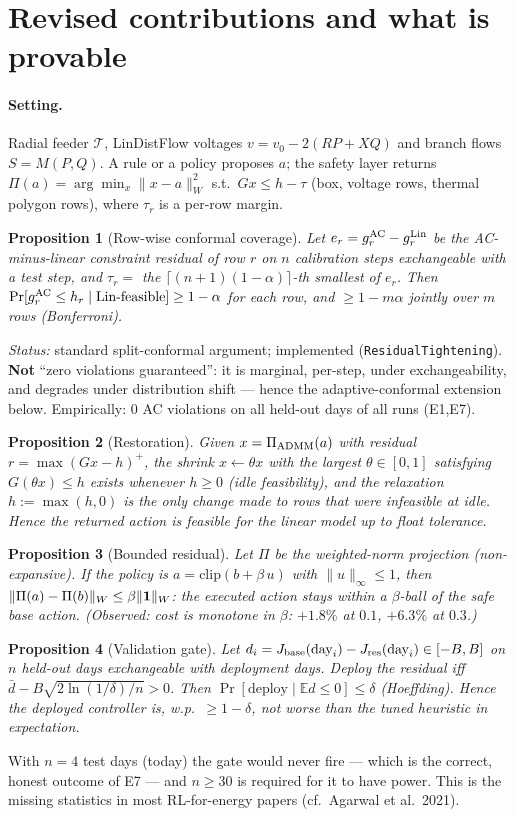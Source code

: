 \documentclass[10pt,a4paper]{article}
\newtheorem{proposition}{Proposition}
\begin{document}
\section{Revised contributions and what is provable}
\paragraph{Setting.} Radial feeder $\mathcal T$, LinDistFlow voltages $v=v_0-2(RP+XQ)$ and branch flows $S=M(P,Q)$. A rule or a policy proposes
$a$; the safety layer returns $\Pi(a)=\arg\min_{x}\|x-a\|_W^2$ s.t.\ $Gx\le h-\tau$ (box, voltage rows, thermal polygon rows),
where $\tau_r$ is a per-row margin.
\begin{proposition}[Row-wise conformal coverage]\label{p1}
Let $e_r=g_r^{\rm AC}-g_r^{\rm Lin}$ be the AC-minus-linear constraint residual of row $r$ on $n$ calibration steps
exchangeable with a test step, and $\tau_r=$ the $\lceil(n+1)(1-\alpha)\rceil$-th smallest of $e_r$. Then
$\Pr[g^{\rm AC}_r\le h_r \mid \text{Lin-feasible}]\ge1-\alpha$ for each row, and $\ge1-m\alpha$ jointly over $m$ rows (Bonferroni).
\end{proposition}
\noindent\emph{Status:} standard split-conformal argument; implemented (\texttt{ResidualTightening}). \textbf{Not} ``zero
violations guaranteed'': it is marginal, per-step, under exchangeability, and degrades under distribution shift --- hence the
adaptive-conformal extension below. Empirically: 0 AC violations on all held-out days of all runs (E1,E7).
\begin{proposition}[Restoration]\label{p2}
Given $x=\Pi_{\rm ADMM}(a)$ with residual $r=\max(Gx-h)^+$, the shrink $x\leftarrow\theta x$ with the largest
$\theta\in[0,1]$ satisfying $G(\theta x)\le h$ exists whenever $h\ge0$ (idle feasibility), and the relaxation $h:=\max(h,0)$ is the
only change made to rows that were infeasible at idle. Hence the returned action is feasible for the linear model up to float tolerance.
\end{proposition}
\begin{proposition}[Bounded residual]\label{p3}
Let $\Pi$ be the weighted-norm projection (non-expansive). If the policy is $a=\mathrm{clip}(b+\beta\,u)$ with $\|u\|_\infty\le1$, then
$\|\Pi(a)-\Pi(b)\|_W\le\beta\|{\bf 1}\|_W$: the executed action stays within a $\beta$-ball of the safe base action. (Observed:
cost is monotone in $\beta$: $+1.8\%$ at $0.1$, $+6.3\%$ at $0.3$.)
\end{proposition}
\begin{proposition}[Validation gate]\label{p4}
Let $d_i=J_{\rm base}(\text{day}_i)-J_{\rm res}(\text{day}_i)\in[-B,B]$ on $n$ held-out days exchangeable with deployment days.
Deploy the residual iff $\bar d-B\sqrt{2\ln(1/\delta)/n}>0$. Then $\Pr[\text{deploy}\mid\mathbb E d\le0]\le\delta$ (Hoeffding).
Hence the deployed controller is, w.p.\ $\ge1-\delta$, not worse than the tuned heuristic in expectation.
\end{proposition}
\noindent With $n=4$ test days (today) the gate would never fire --- which is the correct, honest outcome of E7 --- and $n\ge30$ is
required for it to have power. This is the missing statistics in most RL-for-energy papers (cf.\ Agarwal et al.\ 2021).
\end{document}
